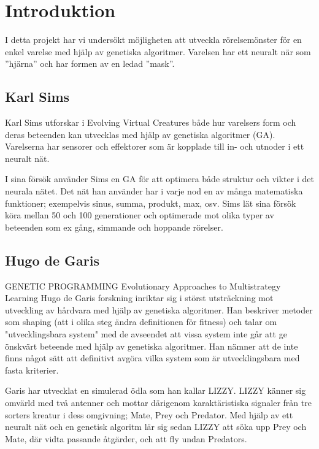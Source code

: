 \documentclass[titlepage, a4paper, 12pt]{article}
\begin{document}
\section{Introduktion}

I detta projekt har vi undersökt möjligheten att utveckla rörelsemönster för en enkel varelse med hjälp av genetiska algoritmer. Varelsen har ett neuralt när som ”hjärna” och har formen av en ledad ”mask”.

\subsection{Karl Sims}
Karl Sims utforskar i Evolving Virtual Creatures \cite{sims} både hur varelsers form och deras beteenden kan utvecklas med hjälp av genetiska algoritmer (GA). Varelserna har sensorer och effektorer som är kopplade till in- och utnoder i ett neuralt nät. 

I sina försök använder Sims en GA för att optimera både struktur och vikter i det neurala nätet. Det nät han använder har i varje nod en av många matematiska funktioner; exempelvis sinus, summa, produkt, max, osv. Sims lät sina försök köra mellan 50 och 100 generationer och optimerade mot olika typer av beteenden som ex gång, simmande och hoppande rörelser. 

\subsection{Hugo de Garis}
GENETIC PROGRAMMING Evolutionary Approaches to Multistrategy Learning\cite{garis}
Hugo de Garis forskning inriktar sig i störst utsträckning mot utveckling av hårdvara med hjälp av genetiska algoritmer. Han beskriver metoder som shaping (att i olika steg ändra definitionen för fitness) och talar om "utvecklingsbara system" med de avseendet att vissa system inte går att ge önskvärt beteende med hjälp av genetiska algoritmer. Han nämner att de inte finns något sätt att definitivt avgöra vilka system som är utvecklingsbara med fasta kriterier.

Garis har utvecklat en simulerad ödla som han kallar LIZZY. LIZZY känner sig omvärld med två antenner och mottar därigenom karaktäristiska signaler från tre sorters kreatur i dess omgivning; Mate, Prey och Predator. Med hjälp av ett neuralt nät och en genetisk algoritm lär sig sedan LIZZY att söka upp Prey och Mate, där vidta passande åtgärder, och att fly undan Predators.
\end{document}
